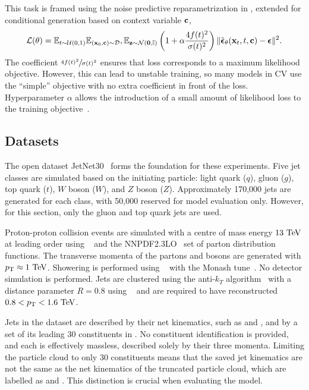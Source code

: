This task is framed using the noise predictive reparametrization in , extended for conditional generation based on context variable $\mathbf{c}$,
\begin{equation}
    \label{eq:training_objective}
    \mathcal{L}(\theta) =
    \mathbb{E}_{t\sim \mathcal{U}(0, 1)}
    \mathbb{E}_{(\mathbf{x}_0, \mathbf{c}) \sim \mathcal{D}},
    \mathbb{E}_{\mathbf{z} \sim \mathcal{N}(\mathbf{0}, \mathbb{I})}
    \left(1 + \alpha \frac{4f(t)^2}{\sigma(t)^2}\right)
    \| \hat{\boldsymbol{\epsilon}}_\theta (\mathbf{x}_t, t, \mathbf{c}) - \boldsymbol{\epsilon} \|^2.
\end{equation}
The coefficient $\sfrac{4f(t)^2}{\sigma(t)^2}$ ensures that loss corresponds to a maximum likelihood objective.
However, this can lead to unstable training, so many models in CV use the ``simple'' objective with no extra coefficient in front of the loss.
Hyperparameter $\alpha$ allows the introduction of a small amount of likelihood loss to the training objective~\cite{ImprovedDenoisingDiffusion}.

\subsection{Datasets}
\label{sec:jetgen_data}

The open dataset JetNet30~\cite{MPGAN} forms the foundation for these experiments.
Five jet classes are simulated based on the initiating particle: light quark ($q$), gluon ($g$), top quark ($t$), $W$ boson ($W$), and $Z$ boson ($Z$).
Approximately 170,000 jets are generated for each class, with 50,000 reserved for model evaluation only.
However, for this section, only the gluon and top quark jets are used.

Proton-proton collision events are simulated with a centre of mass energy $13~\TeV$ at leading order using \madgraph~\cite{MadGraph} and the \textsc{NNPDF2.3LO}~\cite{PDF2.3} set of parton distribution functions.
The transverse momenta of the partons and bosons are generated with $\pt \approx 1~\TeV$.
Showering is performed using ~\cite{Pythia8} with the Monash tune~\cite{Monash}.
No detector simulation is performed.
Jets are clustered using the anti-$k_T$ algorithm~\cite{AntiKt} with a distance parameter $R=0.8$ using \fastjet~\cite{FastJet} and are required to have reconstructed $0.8 < \pt < 1.6~\TeV$.

Jets in the dataset are described by their net kinematics, such as \mjet and \ptjet, and by a set of its leading 30 constituents in \pt.
No constituent identification is provided, and each is effectively massless, described solely by their three momenta.
Limiting the particle cloud to only 30 constituents means that the saved jet kinematics are not the same as the net kinematics of the truncated particle cloud, which are labelled as \mpc and \ptpc.
This distinction is crucial when evaluating the model.

